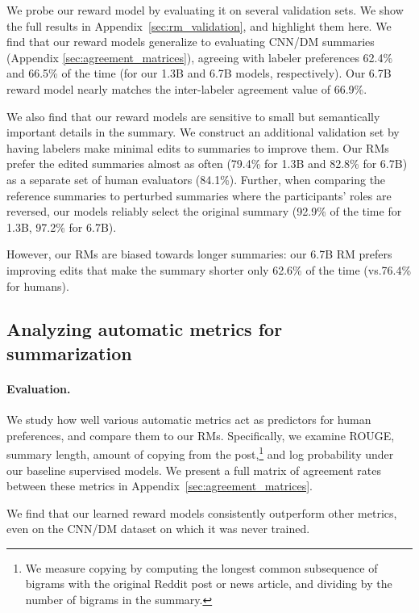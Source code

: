 We probe our reward model by evaluating it on several validation sets. We show the full results in Appendix~\ref{sec:rm_validation}, and highlight them here. We find that our reward models generalize to evaluating CNN/DM summaries (Appendix \ref{sec:agreement_matrices}), agreeing with labeler preferences 62.4\% and 66.5\% of the time (for our 1.3B and 6.7B models, respectively). Our 6.7B reward model nearly matches the inter-labeler agreement value of 66.9\%. 

We also find that our reward models are sensitive to small but semantically important details in the summary. We construct an additional validation set by having labelers make minimal edits to summaries to improve them. Our RMs prefer the edited summaries almost as often (79.4\% for 1.3B and 82.8\% for 6.7B) as a separate set of human evaluators (84.1\%). Further, when comparing the reference summaries to perturbed summaries where the participants' roles are reversed, our models reliably select the original summary (92.9\% of the time for 1.3B, 97.2\% for 6.7B). 

However, our RMs are biased towards longer summaries: our 6.7B RM prefers improving edits that make the summary shorter only 62.6\% of the time (vs.\@ 76.4\% for humans).

\subsection{Analyzing automatic metrics for summarization}
\label{sec:automatic_metrics}

\paragraph{Evaluation.}

We study how well various automatic metrics act as predictors for human preferences, and compare them to our RMs. Specifically, we examine ROUGE, summary length, amount of copying from the post,\footnote{We measure copying by computing the longest common subsequence of bigrams with the original Reddit post or news article, and dividing by the number of bigrams in the summary.} and log probability under our baseline supervised models. We present a full matrix of agreement rates between these metrics in Appendix~\ref{sec:agreement_matrices}.

We find that our learned reward models consistently outperform other metrics, even on the CNN/DM dataset on which it was never trained. 

